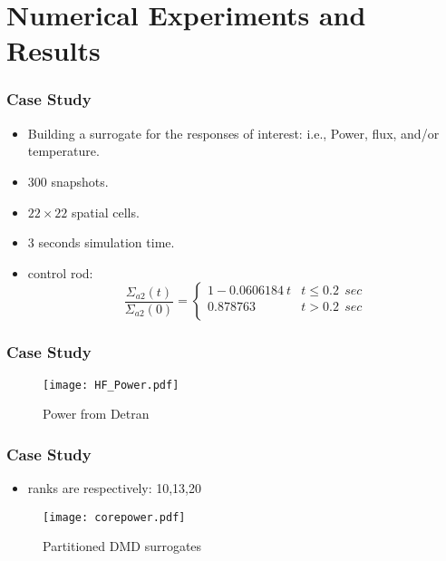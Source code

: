 \documentclass[fleqn]{beamer}
\begin{document}
\section{Numerical Experiments and Results}
\begin{frame}
\frametitle{Case Study}
\begin{itemize}
\item Building a surrogate for the responses of interest: i.e., Power, flux, and/or temperature.

\item 300 snapshots.
\item $22 \times 22$ spatial cells.
\item 3 seconds simulation time.
\item control rod:
\begin{equation*}
    \frac{\Sigma_{a2}(t)}{\Sigma_{a2}(0)}=\left\{
\begin{array}{ll}
1-0.0606184 \ t & t\le 0.2 \ \ sec\\
0.878763 & t>0.2 \ \ sec\\
\end{array} \right. 
\end{equation*}

\end{itemize}
\end{frame}

\begin{frame}
\frametitle{Case Study}
\begin{figure}[ht]
\texttt{[image: HF\_Power.pdf]}
\caption{Power from Detran}
\end{figure}
\end{frame}


\begin{frame}
\frametitle{Case Study}
\begin{itemize}
 \item ranks are respectively: 10,13,20
\end{itemize}

\begin{figure}[ht]
\texttt{[image: corepower.pdf]}
\caption{Partitioned DMD surrogates}
\end{figure}
\end{frame}
\end{document}
